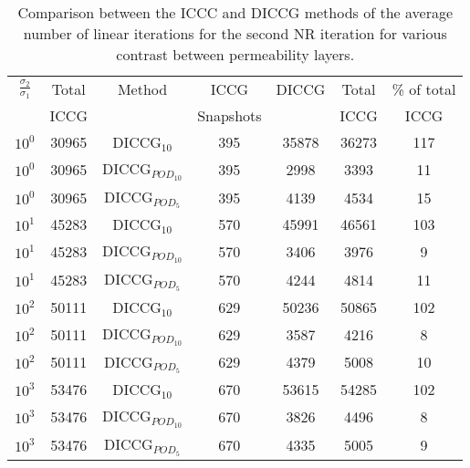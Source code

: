\documentclass[12pt]{article}
\begin{document}


\begin{table}[!ht]\centering
\begin{minipage}{1\textwidth}
 \centering
\begin{tabular}{ ||c|c||c|c|c|c|c||} 
\hline
$\frac{\sigma_2}{\sigma_1}$&Total&Method  & ICCG&DICCG &Total&\% of total\\ 
                           & ICCG     &  & Snapshots& &ICCG& ICCG\\ 
                           \hline
$10^{0}$ &30965& DICCG$_{10}$&395&35878&36273&117\\ 
\hline  
$10^{0}$ &30965& DICCG$_{POD_{10}}$&395&2998&3393&11 \\ 
\hline  
$10^{0}$ &30965& DICCG$_{POD_{5}}$&395&4139&4534&15 \\ 
\hline  
$10^{1}$ &45283& DICCG$_{10}$&570&45991&46561&103\\ 
\hline  
$10^{1}$ &45283& DICCG$_{POD_{10}}$&570&3406&3976&9 \\ 
\hline  
$10^{1}$ &45283& DICCG$_{POD_{5}}$&570&4244&4814&11 \\ 
\hline  
$10^{2}$ &50111& DICCG$_{10}$&629&50236&50865&102\\ 
\hline  
$10^{2}$ &50111& DICCG$_{POD_{10}}$&629&3587&4216&8 \\ 
\hline  
$10^{2}$ &50111& DICCG$_{POD_{5}}$&629&4379&5008&10 \\ 
\hline 
$10^{3}$ &53476& DICCG$_{10}$&670&53615&54285&102\\ 
\hline  
$10^{3}$ &53476& DICCG$_{POD_{10}}$&670&3826&4496&8 \\ 
\hline  
$10^{3}$ &53476& DICCG$_{POD_{5}}$&670&4335&5005&9 \\ 
\hline 
\end{tabular} 
\caption{Comparison between the ICCC and DICCG methods of the average number of linear iterations for the second NR iteration for various contrast between permeability layers. }\label{table:litertot2} 
\end{minipage}  
\end{table}  
\end{document}
